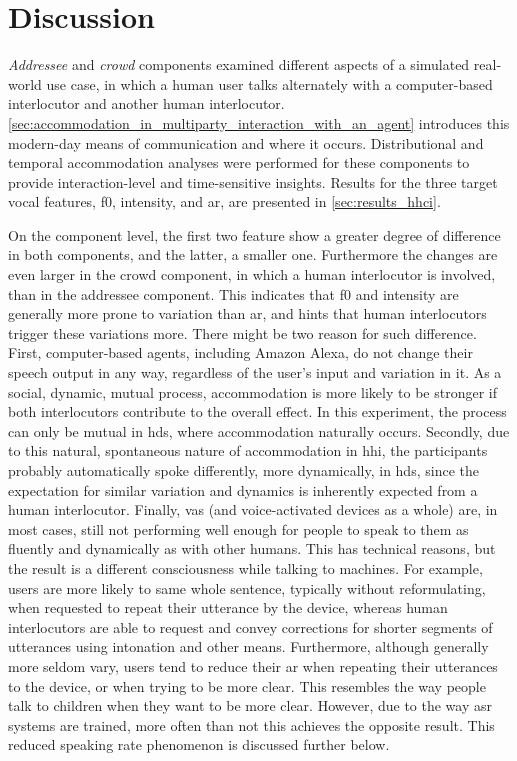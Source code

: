 \section{Discussion}
\label{sec:discussion}

\emph{Addressee} and \emph{crowd} components examined different aspects of a simulated real-world use case, in which a human user talks alternately with a computer-based interlocutor and another human interlocutor.
\cref{sec:accommodation_in_multiparty_interaction_with_an_agent} introduces this modern-day means of communication and where it occurs.
Distributional and temporal accommodation analyses were performed for these components to provide interaction-level and time-sensitive insights.
Results for the three target vocal features, \ac{f0}, intensity, and \ac{ar}, are presented in \cref{sec:results_hhci}.

On the component level, the first two feature show a greater degree of difference in both components, and the latter, a smaller one.
Furthermore the changes are even larger in the crowd component, in which a human interlocutor is involved, than in the addressee component.
This indicates that \ac{f0} and intensity are generally more prone to variation than \ac{ar}, and hints that human interlocutors trigger these variations more.
There might be two reason for such difference.
First, computer-based agents, including Amazon Alexa, do not change their speech output in any way, regardless of the user's input and variation in it.
As a social, dynamic, mutual process, accommodation is more likely to be stronger if both interlocutors contribute to the overall effect.
In this experiment, the process can only be mutual in \ac{hds}, where accommodation naturally occurs.
Secondly, due to this natural, spontaneous nature of accommodation in \ac{hhi}, the participants probably automatically spoke differently, more dynamically, in \ac{hds}, since the expectation for similar variation and dynamics is inherently expected from a human interlocutor.
Finally, \acp{va} (and voice-activated devices as a whole) are, in most cases, still not performing well enough for people to speak to them as fluently and dynamically as with other humans.
This has technical reasons, but the result is a different consciousness while talking to machines.
For example, users are more likely to same whole sentence, typically without reformulating, when requested to repeat their utterance by the device, whereas human interlocutors are able to request and convey corrections for shorter segments of utterances using intonation and other means.
Furthermore, although generally more seldom vary, users tend to reduce their \ac{ar} when repeating their utterances to the device, or when trying to be more clear.
This resembles the way people talk to children when they want to be more clear.
However, due to the way \ac{asr} systems are trained, more often than not this achieves the opposite result.
This reduced speaking rate phenomenon is discussed further below.

